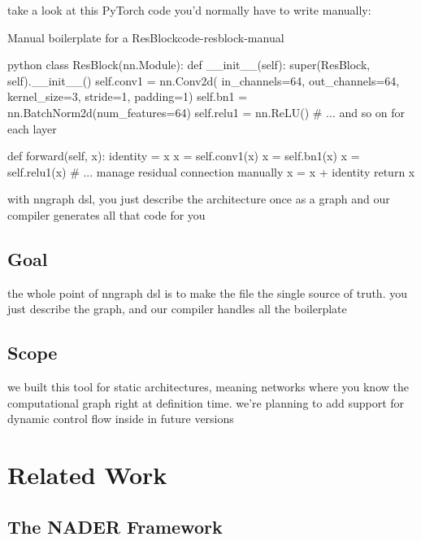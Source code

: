 \documentclass{nngraph-en}
\begin{document}
take a look at this PyTorch code you'd normally have to write manually:

\begin{codebox}{Manual boilerplate for a ResBlock}{code-resblock-manual}
\begin{amzcode}{python}
class ResBlock(nn.Module):
    def __init__(self):
        super(ResBlock, self).__init__()
        self.conv1 = nn.Conv2d(
            in_channels=64, out_channels=64,
            kernel_size=3, stride=1, padding=1)
        self.bn1   = nn.BatchNorm2d(num_features=64)
        self.relu1 = nn.ReLU()
        # ... and so on for each layer

    def forward(self, x):
        identity = x
        x = self.conv1(x)
        x = self.bn1(x)
        x = self.relu1(x)
        # ... manage residual connection manually
        x = x + identity
        return x
\end{amzcode}
\end{codebox}

with nngraph dsl, you just describe the architecture once as a graph and our compiler generates all that code for you

\section{Goal}

the whole point of nngraph dsl is to make the  file the single source of truth. you just describe the graph, and our compiler handles all the boilerplate

\section{Scope}

we built this tool for static architectures, meaning networks where you know the computational graph right at definition time. we're planning to add support for dynamic control flow inside  in future versions

\chapter{Related Work}

\section{The NADER Framework}
\end{document}
